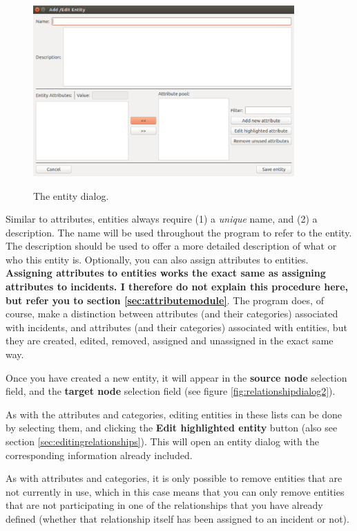 \documentclass{memoir}
\begin{document}
\begin{figure}[h!]
  \centering
  \caption{The entity dialog.}
  \includegraphics[width=100mm]{Screenshot_16.pdf}
  \label{fig:entitydialog}
\end{figure}

Similar to attributes, entities always require (1) a \emph{unique} name, and (2) a description. The name will be used throughout the program to refer to the entity. The description should be used to offer a more detailed description of what or who this entity is. Optionally, you can also assign attributes to entities. \textbf{Assigning attributes to entities works the exact same as assigning attributes to incidents. I therefore do not explain this procedure here, but refer you to section \ref{sec:attributemodule}}. The program does, of course, make a distinction between attributes (and their categories) associated with incidents, and attributes (and their categories) associated with entities, but they are created, edited, removed, assigned and unassigned in the exact same way.  

Once you have created a new entity, it will appear in the \textbf{source node} selection field, and the \textbf{target node} selection field (see figure \ref{fig:relationshipdialog2}).

As with the attributes and categories, editing entities in these lists can be done by selecting them, and clicking the \textbf{Edit highlighted entity} button (also see section \ref{sec:editingrelationships}). This will open an entity dialog with the corresponding information already included. 

As with attributes and categories, it is only possible to remove entities that are not currently in use, which in this case means that you can only remove entities that are not participating in one of the relationships that you have already defined (whether that relationship itself has been assigned to an incident or not).
\end{document}
